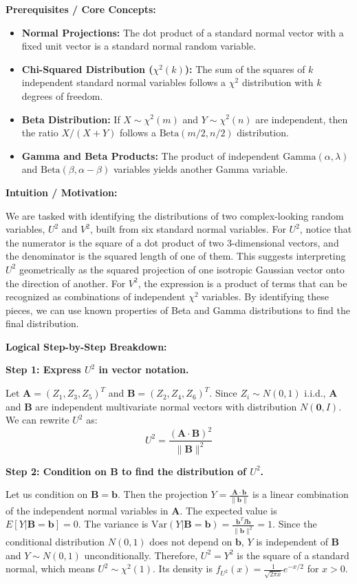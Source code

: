 \begin{solution}
\textbf{Prerequisites / Core Concepts:}
\begin{itemize}
    \item \textbf{Normal Projections:} The dot product of a standard normal vector with a fixed unit vector is a standard normal random variable.
    \item \textbf{Chi-Squared Distribution ($\chi^2(k)$):} The sum of the squares of $k$ independent standard normal variables follows a $\chi^2$ distribution with $k$ degrees of freedom.
    \item \textbf{Beta Distribution:} If $X \sim \chi^2(m)$ and $Y \sim \chi^2(n)$ are independent, then the ratio $X / (X + Y)$ follows a $\text{Beta}(m/2, n/2)$ distribution.
    \item \textbf{Gamma and Beta Products:} The product of independent $\text{Gamma}(\alpha, \lambda)$ and $\text{Beta}(\beta, \alpha - \beta)$ variables yields another Gamma variable.
\end{itemize}

\textbf{Intuition / Motivation:}

We are tasked with identifying the distributions of two complex-looking random variables, $U^2$ and $V^2$, built from six standard normal variables. For $U^2$, notice that the numerator is the square of a dot product of two 3-dimensional vectors, and the denominator is the squared length of one of them. This suggests interpreting $U^2$ geometrically as the squared projection of one isotropic Gaussian vector onto the direction of another. For $V^2$, the expression is a product of terms that can be recognized as combinations of independent $\chi^2$ variables. By identifying these pieces, we can use known properties of Beta and Gamma distributions to find the final distribution.

\textbf{Logical Step-by-Step Breakdown:}

\textbf{Step 1: Express $U^2$ in vector notation.}

Let $\mathbf{A} = (Z_1, Z_3, Z_5)^T$ and $\mathbf{B} = (Z_2, Z_4, Z_6)^T$. Since $Z_i \sim N(0, 1)$ i.i.d., $\mathbf{A}$ and $\mathbf{B}$ are independent multivariate normal vectors with distribution $N(\mathbf{0}, I)$.
We can rewrite $U^2$ as:
\[ U^2 = \frac{(\mathbf{A} \cdot \mathbf{B})^2}{\|\mathbf{B}\|^2} \]

\textbf{Step 2: Condition on $\mathbf{B}$ to find the distribution of $U^2$.}

Let us condition on $\mathbf{B} = \mathbf{b}$. Then the projection $Y = \frac{\mathbf{A} \cdot \mathbf{b}}{\|\mathbf{b}\|}$ is a linear combination of the independent normal variables in $\mathbf{A}$.
The expected value is $E[Y|\mathbf{B}=\mathbf{b}] = 0$.
The variance is $\text{Var}(Y|\mathbf{B}=\mathbf{b}) = \frac{\mathbf{b}^T I \mathbf{b}}{\|\mathbf{b}\|^2} = 1$.
Since the conditional distribution $N(0, 1)$ does not depend on $\mathbf{b}$, $Y$ is independent of $\mathbf{B}$ and $Y \sim N(0, 1)$ unconditionally.
Therefore, $U^2 = Y^2$ is the square of a standard normal, which means $U^2 \sim \chi^2(1)$.
Its density is $f_{U^2}(x) = \frac{1}{\sqrt{2\pi x}} e^{-x/2}$ for $x > 0$.


\end{solution}
